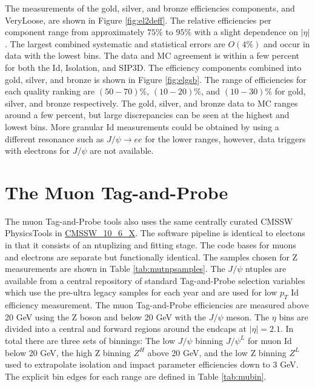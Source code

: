 The measurements of the gold, silver, and bronze efficiencies components, and VeryLoose, are shown in Figure \ref{fig:el2deff}. The relative efficiencies per component range from approximately $75\%$ to $95\%$ with a slight dependence on $|\eta|$. The largest combined systematic and statistical errors are $O(4\%)$ and occur in data with the lowest \pt bins. The data and MC agreement is within a few percent for both the Id, Isolation, and SIP3D. The efficiency components combined into gold, silver, and bronze is shown in Figure \ref{fig:elgsb}. The range of efficiencies for each quality ranking are $(50-70)\%$, $(10-20)\%$, and $(10-30)\%$ for gold, silver, and bronze respectively. The gold, silver, and bronze data to MC ranges around a few percent, but large discrepancies can be seen at the highest and lowest \pt bins. More granular Id measurements could be obtained by using a different resonance such as $J/\psi \rightarrow ee$ for the lower \pt ranges, however, data triggers with electrons for $J/\psi$ are not available.




\FloatBarrier
\section{The Muon Tag-and-Probe}
The muon Tag-and-Probe tools also uses the same centrally curated CMSSW PhysicsTools in \url{CMSSW_10_6_X}. The software pipeline is identical to electons in that it consists of an ntuplizing \cite{MuTnPTwiki} and fitting \cite{MuTnPAnaTwiki} stage. The code bases for muons and electrons are separate but functionally identical. The samples chosen for Z measurements are shown in Table \ref{tab:mutnpsamples}. The $J/\psi$ ntuples are available from a central repository of standard Tag-and-Probe selection variables which use the pre-ultra legacy samples for each year \cite{MuTnPCentralSamps} and are used for low $p_T$ Id efficiency measurement. The muon Tag-and-Probe efficiencies are measured above 20 GeV using the Z boson and below 20 GeV with the $J/\psi$ meson. The $\eta$ bins are divided into a central and forward regions around the endcaps at $|\eta| = 2.1$. In total there are three sets of binnings: The low \pt $J/\psi$ binning $J/\psi^{L}$ for muon Id below 20 GeV, the high \pt Z binning $Z^{H}$ above 20 GeV, and the low \pt Z binning $Z^{L}$ used to extrapolate isolation and impact parameter efficiencies down to 3 GeV.  The explicit bin edges for each range are defined in Table \ref{tab:mubin}.


